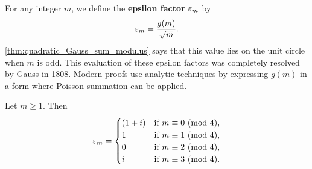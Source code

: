    For any integer \(m\), we define the \textbf{epsilon factor} \(\varepsilon_{m}\) by
    \[
      \varepsilon_{m} = \frac{g(m)}{\sqrt{m}}.
    \]
    \cref{thm:quadratic_Gauss_sum_modulus} says that this value lies on the unit circle when \(m\) is odd. This evaluation of these epsilon factors was completely resolved by Gauss in 1808. Modern proofs use analytic techniques by expressing \(g(m)\) in a form where Poisson summation can be applied.

    \begin{theorem}\label{thm:Gauss's_evaluation}
      Let \(m \ge 1\). Then
      \[
        \varepsilon_{m} = \begin{cases} (1+i) & \text{if \(m \equiv 0 \ (\mathrm{mod}\text{ }4)\)}, \\ 1 & \text{if \(m \equiv 1 \ (\mathrm{mod}\text{ }4)\)}, \\ 0 & \text{if \(m \equiv 2 \ (\mathrm{mod}\text{ }4)\)}, \\ i & \text{if \(m \equiv 3 \ (\mathrm{mod}\text{ }4)\)}. \end{cases}
      \]
    \end{theorem}
